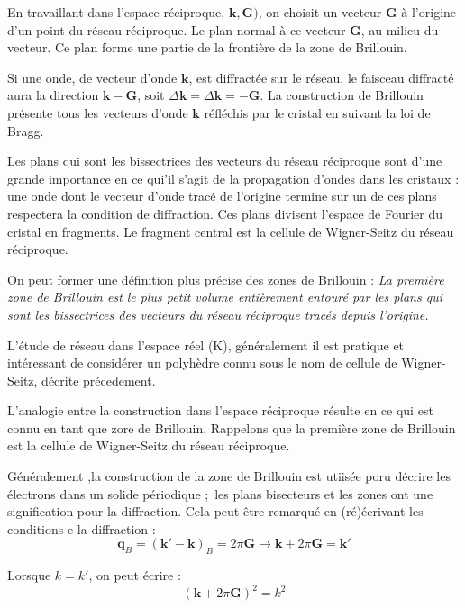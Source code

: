 En travaillant dans l'espace réciproque, $\mathbf{k},\mathbf{G})$, on choisit un
vecteur $\mathbf{G}$ à l'origine d'un point du réseau réciproque. Le plan normal
à ce vecteur $\mathbf{G}$, au milieu du vecteur. Ce plan forme une partie de la
frontière de la zone de Brillouin.

Si une onde, de vecteur d'onde $\mathbf{k}$, est diffractée sur le réseau, le
faisceau diffracté aura la direction $\mathbf{k}-\mathbf{G}$, soit $\Delta\mathbf{k} = \Delta\mathbf{k} = -\mathbf{G}$.
La construction de Brillouin présente tous les vecteurs d'onde $\mathbf{k}$
réfléchis par le cristal en suivant la loi de Bragg.

Les plans qui sont les bissectrices des vecteurs du réseau réciproque sont d'une
grande importance en ce qui'il s'agit de la propagation d'ondes dans les
cristaux : une onde dont le vecteur d'onde tracé de l'origine termine sur un 
de ces plans respectera la condition de diffraction. Ces plans divisent l'espace
de Fourier du cristal en fragments. Le fragment central est la cellule de
Wigner-Seitz du réseau réciproque.

On peut former une définition plus précise des zones de Brillouin : \emph{
    La première zone de Brillouin est le plus petit volume entièrement entouré
    par les plans qui sont les bissectrices des vecteurs du réseau réciproque
tracés depuis l'origine.}




L'étude de réseau dans l'espace réel (K), généralement il est pratique et
intéressant de considérer un polyhèdre connu sous le nom de cellule de 
Wigner-Seitz, décrite précedement.

L'analogie entre la construction dans l'espace réciproque résulte en ce qui est
connu en tant que zore de Brillouin. Rappelons que la première zone de Brillouin 
est la cellule de Wigner-Seitz du réseau réciproque.

Généralement ,la construction de la zone de Brillouin est utiisée poru décrire
les électrons dans un solide périodique ; les plans bisecteurs et les
zones ont une signification pour la diffraction. Cela peut être remarqué en 
(ré)écrivant les conditions e la diffraction :
\begin{equation}
    \mathbf{q}_B = (\mathbf{k'-k})_B = 2\pi\mathbf{G} \rightarrow \mathbf{k} + 2\pi \mathbf{G} = \mathbf{k'}
\end{equation}

Lorsque $k=k'$, on peut écrire :
\begin{equation}
    (\mathbf{k} + 2\pi \mathbf{G})^2 = k^2
\end{equation}

